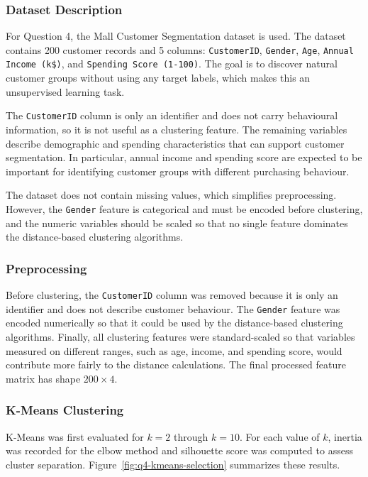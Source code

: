\documentclass[11pt]{article}
\begin{document}
\subsubsection{Dataset Description}

For Question 4, the Mall Customer Segmentation dataset is used. The dataset contains 200 customer records and 5 columns: \texttt{CustomerID}, \texttt{Gender}, \texttt{Age}, \texttt{Annual Income (k\$)}, and \texttt{Spending Score (1-100)}. The goal is to discover natural customer groups without using any target labels, which makes this an unsupervised learning task.

The \texttt{CustomerID} column is only an identifier and does not carry behavioural information, so it is not useful as a clustering feature. The remaining variables describe demographic and spending characteristics that can support customer segmentation. In particular, annual income and spending score are expected to be important for identifying customer groups with different purchasing behaviour.

The dataset does not contain missing values, which simplifies preprocessing. However, the \texttt{Gender} feature is categorical and must be encoded before clustering, and the numeric variables should be scaled so that no single feature dominates the distance-based clustering algorithms.

\subsubsection{Preprocessing}

Before clustering, the \texttt{CustomerID} column was removed because it is only an identifier and does not describe customer behaviour. The \texttt{Gender} feature was encoded numerically so that it could be used by the distance-based clustering algorithms. Finally, all clustering features were standard-scaled so that variables measured on different ranges, such as age, income, and spending score, would contribute more fairly to the distance calculations. The final processed feature matrix has shape \(200 \times 4\).

\subsubsection{K-Means Clustering}

K-Means was first evaluated for \(k=2\) through \(k=10\). For each value of \(k\), inertia was recorded for the elbow method and silhouette score was computed to assess cluster separation. Figure~\ref{fig:q4-kmeans-selection} summarizes these results.
\end{document}
